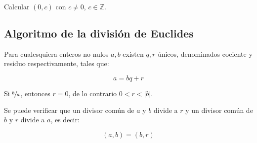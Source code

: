         \begin{ejemplo}
        \end{ejemplo}

        \begin{ejemplo}
        \end{ejemplo}

        \begin{ejercicio}
            Calcular $(0, c)$ con $c \ne 0$, $c \in \mathbb{Z}$.
        \end{ejercicio}

    \newpage
    \subsection{Algoritmo de la división de Euclides}

        \begin{definicion}
            Para cualesquiera enteros no nulos $a, b$ existen $q, r$ únicos, denominados cociente y residuo respectivamente, tales que:

            \begin{equation}
                a = b q + r
            \end{equation}

            Si $\sfrac{b}{a}$, entonces $r = 0$, de lo contrario $0 < r < |b|$.
        \end{definicion}

        \begin{proposicion}
            Se puede verificar que un divisor común de $a$ y $b$ divide a $r$ y un divisor común de $b$ y $r$ divide a $a$, es decir:

            \begin{equation}
                (a, b) = (b, r)
            \end{equation}
        \end{proposicion}

